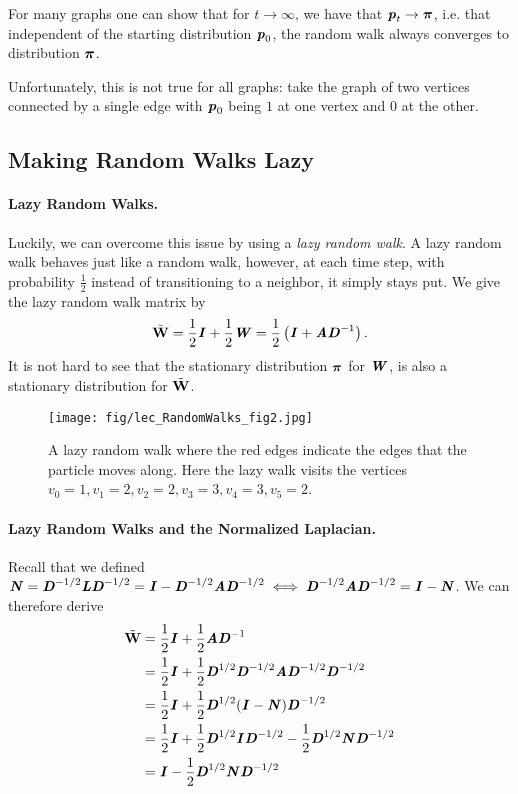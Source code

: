 For many graphs one can show that for $t \to \infty$, we have that $\pp_t \to \ppi$, i.e. that independent of the starting distribution $\pp_0$, the random walk always converges to distribution $\ppi$. 

Unfortunately, this is not true for all graphs: take the graph of two vertices connected by a single edge with $\pp_0$ being $1$ at one vertex and $0$ at the other. 

\subsection{Making Random Walks Lazy}

\paragraph{Lazy Random Walks.} Luckily, we can overcome this issue by using a \emph{lazy random walk}. A lazy random walk behaves just like a random walk, however, at each time step, with probability $\frac{1}{2}$ instead of transitioning to a neighbor, it simply stays put. We give the lazy random walk matrix by
\[
 \WWtil = \frac{1}{2}\II + \frac{1}{2} \WW = \frac{1}{2}\left(\II + \AA \DD^{-1}\right).
\]
It is not hard to see that the stationary distribution $\ppi$ for $\WW$, is also a stationary distribution for $\WWtil$.

\begin{figure}[!ht]
    \centering\label{fig:randomLazyWalkSimple}
    \texttt{[image: fig/lec\_RandomWalks\_fig2.jpg]}
    \caption{A lazy random walk where the red edges indicate the edges that the particle moves along. Here the lazy walk visits the vertices $v_0 = 1, v_1 = 2, v_2 = 2, v_3 = 3, v_4 = 3, v_5 = 2$.}
\end{figure}

\paragraph{Lazy Random Walks and the Normalized Laplacian.} Recall that we defined $\NN = \DD^{-1/2}\LL \DD^{-1/2} = \II - \DD^{-1/2}\AA \DD^{-1/2} \iff \DD^{-1/2}\AA \DD^{-1/2} = \II - \NN$. We can therefore derive
\begin{align*}
    \WWtil &= \frac{1}{2}\II + \frac{1}{2} \AA \DD^{-1}\\
    &= \frac{1}{2}\II + \frac{1}{2} \DD^{1/2}\DD^{-1/2} \AA \DD^{-1/2}\DD^{-1/2}\\
     &= \frac{1}{2}\II + \frac{1}{2} \DD^{1/2}(\II - \NN) \DD^{-1/2}\\
    &= \frac{1}{2}\II + \frac{1}{2} \DD^{1/2}\II \DD^{-1/2} - \frac{1}{2} \DD^{1/2}\NN \DD^{-1/2}\\
    &= \II - \frac{1}{2} \DD^{1/2}\NN \DD^{-1/2}
\end{align*}

